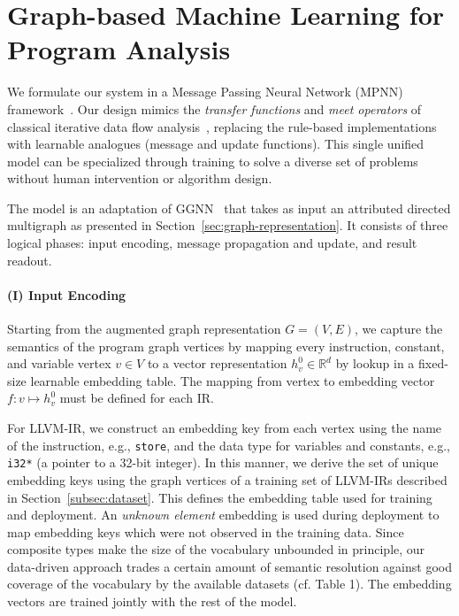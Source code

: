 \section{Graph-based Machine Learning for Program Analysis}
\label{sec:graph-based-machine-learning}

We formulate our system in a Message Passing Neural Network (MPNN)
framework~\citep{Gilmer2017}. Our design mimics the \emph{transfer functions}
and \emph{meet operators} of classical iterative data flow
analysis~\citep{Kam1977,Cooper2003}, replacing the rule-based implementations
with learnable analogues (message and update functions). This single unified
model can be specialized through training to solve a diverse set of problems
without human intervention or algorithm design.

The \programl model is an adaptation of GGNN~\citep{Li2015a} that takes as input
an attributed directed multigraph as presented in
Section~\ref{sec:graph-representation}. It consists of three logical phases:
input encoding, message propagation and update, and result readout.

\paragraph{(I) Input Encoding} Starting from the augmented graph representation
$G = (V, E)$, we capture the semantics of the program graph vertices by mapping
every instruction, constant, and variable vertex $v \in V$ to a vector
representation $h_v^0 \in \mathbb{R}^{d}$ by lookup in a fixed-size learnable
embedding table. The mapping from vertex to embedding vector $f: v \mapsto
h_v^0$ must be defined for each IR.

For LLVM-IR, we construct an embedding key from each vertex using the name of
the instruction, e.g., \texttt{store}, and the data type for variables and
constants, e.g., \texttt{i32*} (a pointer to a 32-bit integer). In this manner,
we derive the set of unique embedding keys using the graph vertices of a
training set of LLVM-IRs described in Section~\ref{subsec:dataset}. This defines
the embedding table used for training and deployment. An \emph{unknown element}
embedding is used during deployment to map embedding keys  which were not
observed in the training data. Since composite types make the size of the
vocabulary unbounded in principle, our data-driven approach trades a certain
amount of semantic resolution against good coverage of the vocabulary by the
available datasets (cf. Table 1). The embedding vectors are trained jointly with
the rest of the model.

